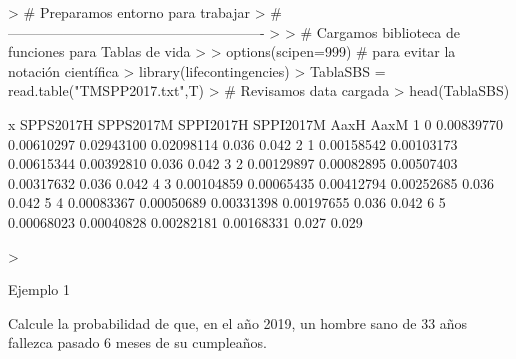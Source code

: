 \documentclass[12pt]{report}
\begin{document}
\begin{Schunk}
\begin{Sinput}
> # Preparamos entorno para trabajar 
> #-------------------------------------------------------
> 
> # Cargamos biblioteca de funciones para Tablas de vida
> 
> options(scipen=999) # para evitar la notación científica
> library(lifecontingencies)
> TablaSBS = read.table("TMSPP2017.txt",T)
> # Revisamos data cargada
> head(TablaSBS)
\end{Sinput}
\begin{Soutput}
  x  SPPS2017H  SPPS2017M  SPPI2017H  SPPI2017M  AaxH  AaxM
1 0 0.00839770 0.00610297 0.02943100 0.02098114 0.036 0.042
2 1 0.00158542 0.00103173 0.00615344 0.00392810 0.036 0.042
3 2 0.00129897 0.00082895 0.00507403 0.00317632 0.036 0.042
4 3 0.00104859 0.00065435 0.00412794 0.00252685 0.036 0.042
5 4 0.00083367 0.00050689 0.00331398 0.00197655 0.036 0.042
6 5 0.00068023 0.00040828 0.00282181 0.00168331 0.027 0.029
\end{Soutput}
\begin{Sinput}
> 
\end{Sinput}
\end{Schunk}

Ejemplo 1

Calcule la probabilidad de que, en el año 2019, un hombre sano
de 33 años fallezca pasado 6 meses de su cumpleaños.
\end{document}
